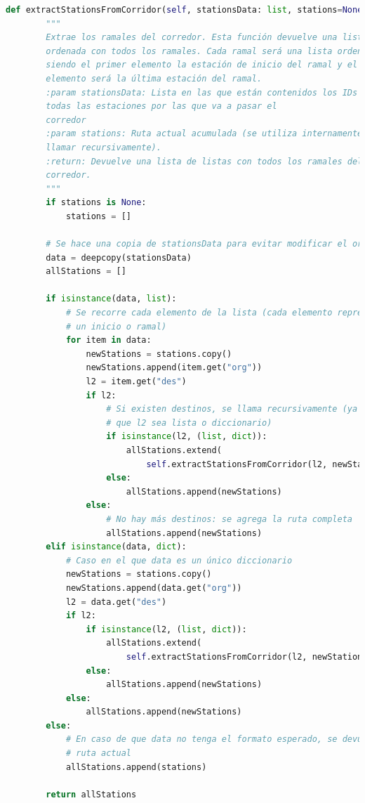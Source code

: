 \begin{lstlisting}[language=Python,
                   style=python,
                   frame=none,
                   numbers=none,
                   basicstyle=\ttfamily\normalsize,
                   caption={Función \texttt{extractStationsFromCorridor}},
                   label=src:functionExtractStationsFromCorridor,
                   inputencoding=utf8]                   
        def extractStationsFromCorridor(self, stationsData: list, stations=None):
        """
        Extrae los ramales del corredor. Esta función devuelve una lista
        ordenada con todos los ramales. Cada ramal será una lista ordenada
        siendo el primer elemento la estación de inicio del ramal y el último
        elemento será la última estación del ramal.
        :param stationsData: Lista en las que están contenidos los IDs de
        todas las estaciones por las que va a pasar el
        corredor
        :param stations: Ruta actual acumulada (se utiliza internamente al
        llamar recursivamente).
        :return: Devuelve una lista de listas con todos los ramales del 
        corredor.
        """
        if stations is None:
            stations = []

        # Se hace una copia de stationsData para evitar modificar el original
        data = deepcopy(stationsData)
        allStations = []

        if isinstance(data, list):
            # Se recorre cada elemento de la lista (cada elemento representa
            # un inicio o ramal)
            for item in data:
                newStations = stations.copy()
                newStations.append(item.get("org"))
                l2 = item.get("des")
                if l2:
                    # Si existen destinos, se llama recursivamente (ya sea
                    # que l2 sea lista o diccionario)
                    if isinstance(l2, (list, dict)):
                        allStations.extend(
                            self.extractStationsFromCorridor(l2, newStations))
                    else:
                        allStations.append(newStations)
                else:
                    # No hay más destinos: se agrega la ruta completa
                    allStations.append(newStations)
        elif isinstance(data, dict):
            # Caso en el que data es un único diccionario
            newStations = stations.copy()
            newStations.append(data.get("org"))
            l2 = data.get("des")
            if l2:
                if isinstance(l2, (list, dict)):
                    allStations.extend(
                        self.extractStationsFromCorridor(l2, newStations))
                else:
                    allStations.append(newStations)
            else:
                allStations.append(newStations)
        else:
            # En caso de que data no tenga el formato esperado, se devuelve la
            # ruta actual
            allStations.append(stations)

        return allStations
\end{lstlisting}

